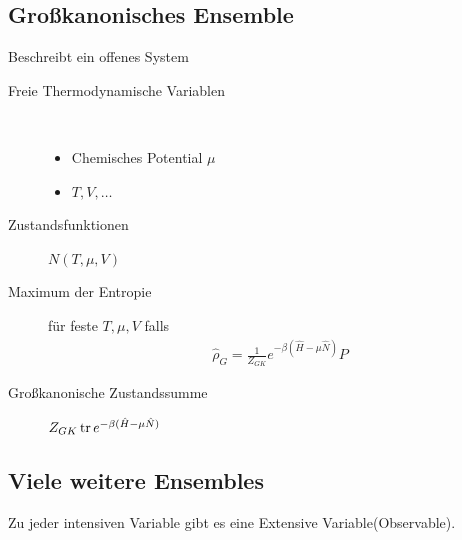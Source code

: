 \subsection*{Gro\ss{}kanonisches Ensemble}
Beschreibt ein offenes System
\begin{description}
  \item[Freie Thermodynamische Variablen]  $ $
    \begin{itemize}
      \item Chemisches Potential $\mu$
      \item $T, V, \ldots$
    \end{itemize}
  \item[Zustandsfunktionen] $N(T, \mu, V)$
  \item[Maximum der Entropie] f\"ur feste $T, \mu, V$ falls
    \begin{align*}
      \hat{\rho}_G = \frac{1}{Z_{GK}} e^{-\beta(\hat{H}- \mu \hat{N})} P
    \end{align*}
  \item[Gro\ss{}kanonische Zustandssumme] $Z_{GK} 
    \operatorname{tr} e^{-\beta(\hat{H}- \mu \hat{N})} $
\end{description}
\subsection*{Viele weitere Ensembles}
Zu jeder intensiven Variable gibt es eine Extensive Variable(Observable).

\begin{center}
\end{center}


